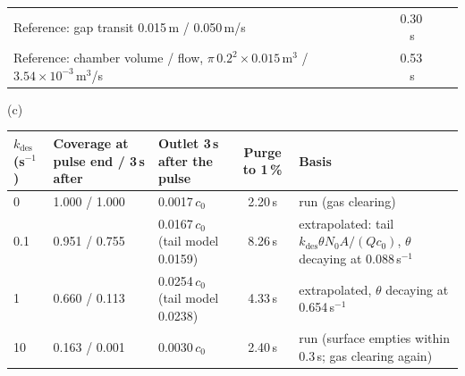 \documentclass[11pt,letterpaper]{article}
\begin{document}
\begin{table}[tbp]
\begin{tabular}{P{1.7in}cP{0.85in}cccP{0.9in}}
Reference: gap transit 0.015\,m / 0.050\,m/s & & & & 0.30\,s & & \\
Reference: chamber volume / flow, $\pi\,0.2^2 \times 0.015$\,m$^3$ / $3.54\times10^{-3}$\,m$^3$/s & & & & 0.53\,s & & \\
\bottomrule
\end{tabular}
\par\medskip (c)\par\medskip
\begin{tabular}{lP{0.85in}P{1.05in}cP{1.7in}}
\toprule
$k_{\mathrm{des}}$ (s$^{-1}$) & Coverage at pulse end / 3\,s after & Outlet 3\,s after the pulse & Purge to 1\,\% & Basis \\
 & 1.000 / 1.000 & 0.0017\,$c_0$ & 2.20\,s & run (gas clearing) \\
0.1 & 0.951 / 0.755 & 0.0167\,$c_0$ (tail model 0.0159) & 8.26\,s & extrapolated: tail $k_{\mathrm{des}}\theta N_0 A/(Q c_0)$, $\theta$ decaying at 0.088\,s$^{-1}$ \\
1 & 0.660 / 0.113 & 0.0254\,$c_0$ (tail model 0.0238) & 4.33\,s & extrapolated, $\theta$ decaying at 0.654\,s$^{-1}$ \\
10 & 0.163 / 0.001 & 0.0030\,$c_0$ & 2.40\,s & run (surface empties within 0.3\,s; gas clearing again) \\
\bottomrule
\end{tabular}
\end{table}
\end{document}

